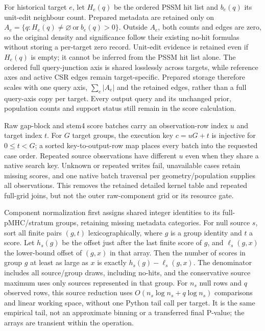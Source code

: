 \documentclass[10pt,a4paper]{article}
\theoremstyle{definition}
\begin{document}
For historical target $e$, let $H_e(q)$ be the ordered PSSM hit list and $b_e(q)$ its unit-edit neighbour count.
Prepared metadata are retained only on $A_e=\{q:H_e(q)\ne\varnothing\ \text{or}\ b_e(q)>0\}$.
Outside $A_e$, both counts and edges are zero, so the original density and significance follow their existing no-hit formulas without storing a per-target zero record.
Unit-edit evidence is retained even if $H_e(q)$ is empty; it cannot be inferred from the PSSM hit list alone.
The ordered full query-junction axis is shared losslessly across targets, while reference axes and active CSR edges remain target-specific.
Prepared storage therefore scales with one query axis, $\sum_e|A_e|$ and the retained edges, rather than a full query-axis copy per target.
Every output query and its unchanged prior, population counts and support status still remain in the score calculation.

Raw gap-block and stem4 score batches carry an observation-row index $u$ and target index $t$.
For $G$ target groups, the execution key $c=uG+t$ is injective for $0\le t<G$; a sorted key-to-output-row map places every batch into the requested case order.
Repeated source observations have different $u$ even when they share a native search key.
Unknown or repeated writes fail, unavailable cases retain missing scores, and one native batch traversal per geometry/population supplies all observations.
This removes the retained detailed kernel table and repeated full-grid joins, but not the outer raw-component grid or its resource gate.

Component normalization first assigns shared integer identities to its full-pMHC/stratum groups, retaining missing metadata categories.
For null source $s$, sort all finite pairs $(g,t)$ lexicographically, where $g$ is a group identity and $t$ a score.
Let $h_s(g)$ be the offset just after the last finite score of $g$, and $\ell_s(g,x)$ the lower-bound offset of $(g,x)$ in that array.
Then the number of scores in group $g$ at least as large as $x$ is exactly $h_s(g)-\ell_s(g,x)$.
The denominator includes all source/group draws, including no-hits, and the conservative source maximum uses only sources represented in that group.
For $n_s$ null rows and $q$ observed rows, this source reduction uses $O(n_s\log n_s+q\log n_s)$ comparisons and linear working space, without one Python tail call per target.
It is the same empirical tail, not an approximate binning or a transferred final P-value; the arrays are transient within the operation.
\end{document}
